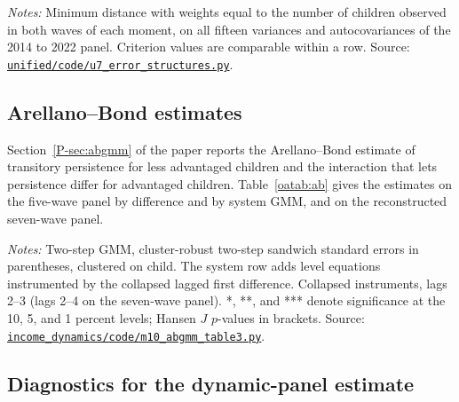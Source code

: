 \documentclass[11pt]{article}
\numberwithin{equation}{section}
\newcommand{\repourl}{https://github.com/JiachenJin1001/before-the-labor-market-or-inside-it}
\newcommand{\code}[1]{\href{\repourl/blob/main/#1}{\nolinkurl{#1}}}
\begin{document}
\begin{table}[H]
\centering
\small
\caption{Minimized criterion under alternative error structures.}
\label{oatab:criterion}
{\setlength{\tabcolsep}{4pt}}
\par\smallskip
\begin{minipage}{0.92\textwidth}
\footnotesize\emph{Notes:} Minimum distance with weights equal to the number of children observed in both waves of each moment, on all fifteen variances and
autocovariances of the 2014 to 2022 panel. Criterion values are
comparable within a row. Source:
\code{unified/code/u7_error_structures.py}.
\end{minipage}
\end{table}

\subsection{Arellano--Bond estimates}
\label{oa:ab}

Section~\ref{P-sec:abgmm} of the paper reports the Arellano--Bond estimate of transitory persistence for less advantaged children and the interaction that lets persistence differ for advantaged children. Table~\ref{oatab:ab} gives the estimates on the five-wave panel by difference and by system GMM, and on the reconstructed seven-wave panel.

\begin{table}[H]
\centering
\small
\caption{Arellano--Bond estimates of the persistence of transitory earnings shocks.}
\label{oatab:ab}

\par\smallskip
\begin{minipage}{0.92\textwidth}
\footnotesize\emph{Notes:} Two-step GMM, cluster-robust two-step sandwich standard errors in parentheses, clustered on child. The system row adds level equations instrumented by the collapsed lagged first difference.  Collapsed instruments, lags 2--3 (lags 2--4 on the seven-wave panel). *, **, and *** denote significance at the 10, 5, and 1 percent levels; Hansen $J$ $p$-values in brackets. Source: \code{income_dynamics/code/m10_abgmm_table3.py}.
\end{minipage}
\end{table}

\subsection{Diagnostics for the dynamic-panel estimate}
\label{oa:abdiag}
\end{document}
